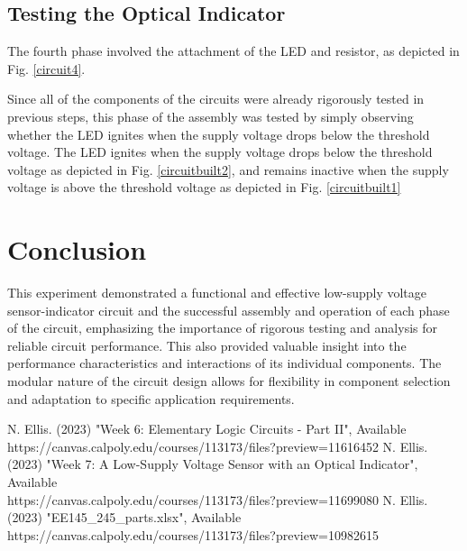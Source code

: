 \documentclass[conference]{IEEEtran}
\begin{document}
\subsection{Testing the Optical Indicator}

The fourth phase involved the attachment of the LED and resistor, as depicted in Fig. \ref{circuit4}.

Since all of the components of the circuits were already rigorously tested in previous steps, this phase of the assembly was tested by simply observing whether the LED ignites when the supply voltage drops below the threshold voltage. The LED ignites when the supply voltage drops below the threshold voltage as depicted in Fig. \ref{circuitbuilt2}, and remains inactive when the supply voltage is above the threshold voltage as depicted in Fig. \ref{circuitbuilt1}



\section{Conclusion}

This experiment demonstrated a functional and effective low-supply voltage sensor-indicator circuit and the successful assembly and operation of each phase of the circuit, emphasizing the importance of rigorous testing and analysis for reliable circuit performance. This also provided valuable insight into the performance characteristics and interactions of its individual components. The modular nature of the circuit design allows for flexibility in component selection and adaptation to specific application requirements.

\begin{thebibliography}{00}
 N. Ellis. (2023) "Week 6: Elementary Logic Circuits - Part II", Available https://canvas.calpoly.edu/courses/113173/files?preview=11616452
 N. Ellis. (2023) "Week 7: A Low-Supply Voltage Sensor with an Optical Indicator", Available \\https://canvas.calpoly.edu/courses/113173/files?preview=11699080
 N. Ellis. (2023) "EE145\_245\_parts.xlsx", Available \\ https://canvas.calpoly.edu/courses/113173/files?preview=10982615
\end{thebibliography}
\vspace{12pt}
\end{document}
